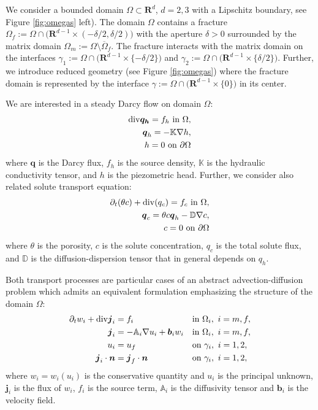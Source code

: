 \documentclass[a4paper]{article}
\def\prtl{\partial}
\def\vc#1{\mathbf{\boldsymbol{#1}}}     %
\def\tn#1{{\mathbb{#1}}}    %
\def\div{{\rm div}}
\def\grad{\nabla}
\def\Real{{\mathbf R}}
\begin{document}
We consider a bounded domain $\Omega \subset \Real^d$, $d=2,3$ with a Lipschitz boundary, see Figure \ref{fig:omegas} left). The domain $\Omega$ contains 
a fracture $\Omega_f:=\Omega\cap \big(\Real^{d-1}\times(-\delta/2,\delta/2)\big)$ 
with the aperture $\delta>0$ surrounded by the matrix domain $\Omega_m:=\Omega\setminus\overline\Omega_f$.  The fracture interacts with the matrix domain on the interfaces
$\gamma_1:=\Omega\cap\big( \Real^{d-1}\times \{-\delta/2\}\big)$ and $\gamma_2:=\Omega\cap \big( \Real^{d-1}\times \{\delta/2\}\big)$. Further, we introduce reduced geometry (see Figure \ref{fig:omegas})
where the fracture domain is represented by the interface $\gamma:=\Omega\cap\big(\Real^{d-1}\times\{0\}\big)$ in its center. 

We are interested in a steady Darcy flow on domain $\Omega$:
\begin{align}
    \label{eq:darcy_flow}
    \div \vc{q_h} = f_h \mbox{ in }\Omega, \\
    \vc q_h = -\tn K \grad h, \\
    h=0\mbox{ on }\partial\Omega
\end{align}
where $\vc q$ is the Darcy flux, $f_h$ is the source density, $\tn K$ is the hydraulic conductivity tensor, and $h$ is the piezometric head.
Further, we consider also related solute transport equation:
\begin{align}
    \label{eq:solute_transport}
    \prtl_t (\theta c) + \div(q_c) = f_c \mbox{ in }\Omega,\\
    \vc q_c = \theta c \vc q_h - \tn D \grad c, \\
    c=0\mbox{ on }\partial\Omega
\end{align}
where $\theta$ is the porosity, $c$ is the solute concentration, $q_c$ is the total solute flux, and $\tn D$ is the diffusion-dispersion tensor that in general depends on $q_h$.

Both transport processes are particular cases of an abstract advection-diffusion problem which admits an equivalent formulation
emphasizing the structure of the domain $\Omega$:
\begin{align}
  \label{eq:fr:continuity}
  \prtl_t w_i + \div \vc j_i &= f_i&&  \text{in } \Omega_i,\ i=m,f,\\
  \label{eq:fr:flux}
  \vc j_i &= - \tn A_i\grad u_i + \vc b_i w_i&& \text{in } \Omega_i,\ i=m,f,\\
  \label{eq:fr:Dirichlet}
  u_i &= u_f&& \text{on } \gamma_i,\ i=1,2,\\
  \label{eq:fr:Neumann}
  \vc j_i \cdot \vc n &= \vc j_f \cdot \vc n&& \text{on } \gamma_i,\ i=1,2,
\end{align}
where $w_i=w_i(u_i)$ is the conservative quantity and $u_i$ is the principal unknown, $\vc j_i$ is the flux of $w_i$, $f_i$ is the source term,
$\tn A_i$ is the diffusivity tensor and $\vc b_i$ is the velocity field. 
\end{document}
